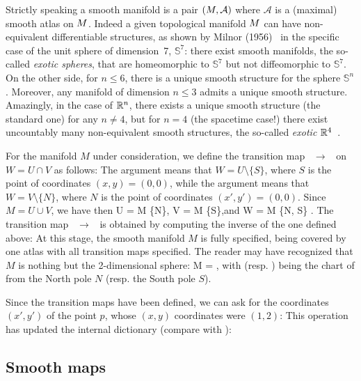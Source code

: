 \begin{remark}
Strictly speaking a smooth manifold is a pair $(M,\mathcal{A})$  where
$\mathcal{A}$ is a (maximal) smooth atlas on $M$.
Indeed a given topological manifold $M$
can have non-equivalent differentiable structures, as shown by Milnor (1956)~\cite{Milno56}
in the specific case of the unit sphere of dimension~7, $\mathbb{S}^7$: there exist smooth manifolds, the so-called \emph{exotic spheres},
that are homeomorphic to $\mathbb{S}^7$ but not diffeomorphic
to $\mathbb{S}^7$.  On the other side, for $n\leq 6$, there is a unique smooth
structure for the sphere $\mathbb{S}^n$.
Moreover, any manifold of dimension $n\leq 3$ admits a unique smooth structure.
Amazingly, in the case of $\mathbb{R}^n$, there exists a unique smooth structure (the standard one) for any $n\not=4$, but for $n=4$ (the spacetime case!) there exist uncountably many non-equivalent smooth structures, the so-called
\emph{exotic $\mathbb{R}^4$}~\cite{Taube87}.
\end{remark}


For the manifold $M$ under consideration, we define the transition map ~$\to$~
on $W = U\cap V$ as follows:
The argument  means that
$W = U\setminus \{S\}$, where $S$ is the point of coordinates $(x,y)=(0,0)$,
while the argument  means that
$W = V\setminus \{N\}$, where $N$ is the point of coordinates $(x',y')=(0,0)$.
Since $M=U\cup V$, we have then
\be
    U = M \setminus \{N\},\qquad
    V = M \setminus \{S\},\quad\mbox{and}\quad
    W = M \setminus \{N, S\} .
\ee
The transition map ~$\to$~ is obtained by computing the inverse
of the one defined above:
At this stage, the smooth manifold $M$ is fully specified, being covered by
one atlas with all transition maps specified. The reader may have recognized that
$M$ is nothing but the 2-dimensional sphere:
\be
    M = \Sp ,
\ee
with  (resp. ) being
the chart of 
from the North pole $N$ (resp. the South pole $S$).

Since the transition maps have been defined,
we can ask for the coordinates $(x',y')$ of the point $p$, whose $(x,y)$
coordinates were $(1,2)$:
This operation has updated the internal dictionary 
(compare with ):

\subsection{Smooth maps}

